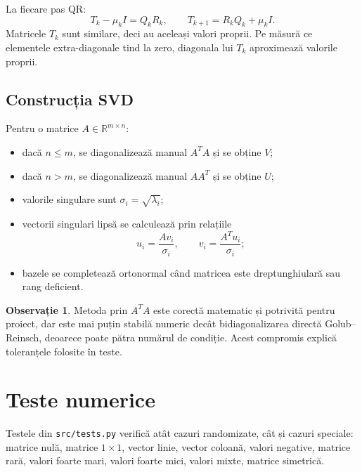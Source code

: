 \documentclass[12pt,a4paper]{article}
\theoremstyle{definition}
\newtheorem{observatie}{Observație}[section]
\begin{document}
La fiecare pas QR:
\[
  T_k-\mu_k I = Q_k R_k,\qquad
  T_{k+1}=R_k Q_k+\mu_k I.
\]
Matricele $T_k$ sunt similare, deci au aceleași valori proprii. Pe măsură ce elementele extra-diagonale tind la zero, diagonala lui $T_k$ aproximează valorile proprii.

\subsection{Construcția SVD}

Pentru o matrice $A\in\mathbb{R}^{m\times n}$:
\begin{itemize}
  \item dacă $n\le m$, se diagonalizează manual $A^T A$ și se obține $V$;
  \item dacă $n>m$, se diagonalizează manual $A A^T$ și se obține $U$;
  \item valorile singulare sunt $\sigma_i=\sqrt{\lambda_i}$;
  \item vectorii singulari lipsă se calculează prin relațiile
  \[
    u_i=\frac{Av_i}{\sigma_i}, \qquad
    v_i=\frac{A^T u_i}{\sigma_i};
  \]
  \item bazele se completează ortonormal când matricea este dreptunghiulară sau rang deficient.
\end{itemize}

\begin{observatie}
Metoda prin $A^T A$ este corectă matematic și potrivită pentru proiect, dar este mai puțin stabilă numeric decât bidiagonalizarea directă Golub--Reinsch, deoarece poate pătra numărul de condiție. Acest compromis explică toleranțele folosite în teste.
\end{observatie}

\section{Teste numerice}

Testele din \texttt{src/tests.py} verifică atât cazuri randomizate, cât și cazuri speciale:
matrice nulă, matrice $1\times1$, vector linie, vector coloană, valori negative, matrice rară, valori foarte mari, valori foarte mici, valori mixte, matrice simetrică.
\end{document}
